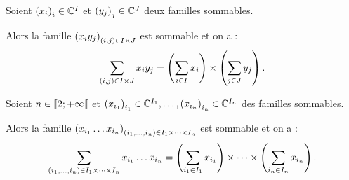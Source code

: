 \begin{cor}
Soient \(\left(x_i\right)_i\in\mathbb{C}^I\) et \(\left(y_j\right)_j\in\mathbb{C}^J\) deux familles sommables.

Alors la famille \(\left(x_iy_j\right)_{\left(i,j\right)\in I\times J}\) est sommable et on a : \[\sum_{\left(i,j\right)\in I\times J}x_iy_j=\left(\sum_{i\in I}x_i\right)\times\left(\sum_{j\in J}y_j\right).\]
\end{cor}

\begin{cor}
Soient \(n\in\left\llbracket2;+\infty\right\llbracket\) et \(\left(x_{i_1}\right)_{i_1}\in\mathbb{C}^{I_1},\dots,\left(x_{i_n}\right)_{i_n}\in\mathbb{C}^{I_n}\) des familles sommables.

Alors la famille \(\left(x_{i_1}\dots x_{i_n}\right)_{\left(i_1,\dots,i_n\right)\in I_1\times\dots\times I_n}\) est sommable et on a : \[\sum_{\left(i_1,\dots,i_n\right)\in I_1\times\dots\times I_n}x_{i_1}\dots x_{i_n}=\left(\sum_{i_1\in I_1}x_{i_1}\right)\times\dots\times\left(\sum_{i_n\in I_n}x_{i_n}\right).\]
\end{cor}